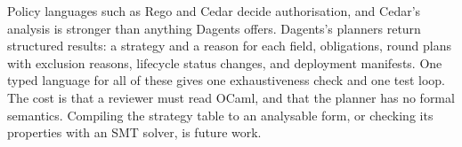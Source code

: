 Policy languages such as Rego and Cedar decide authorisation, and Cedar's
analysis is stronger than anything Dagents offers. Dagents's planners return
structured results: a strategy and a reason for each field, obligations, round
plans with exclusion reasons, lifecycle status changes, and deployment
manifests. One typed language for all of these gives one exhaustiveness check
and one test loop. The cost is that a reviewer must read OCaml, and that the
planner has no formal semantics. Compiling the strategy table to an analysable
form, or checking its properties with an SMT solver, is future work.
